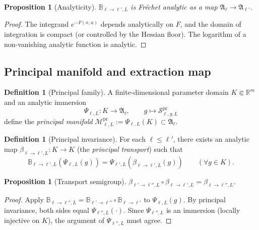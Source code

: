 \documentclass[12pt]{article}
\theoremstyle{plain}
\newtheorem{proposition}[theorem]{Proposition}
\theoremstyle{definition}
\newtheorem{definition}[theorem]{Definition}
\numberwithin{equation}{section}
\newcommand{\R}{\mathbb{R}}
\newcommand{\fA}{\mathfrak{A}}
\newcommand{\pr}{\mathrm{pr}}
\begin{document}
\begin{proposition}[Analyticity]
$\mathbb{B}_{\ell\to\ell',L}$ is Fr\'echet analytic as a map $\fA_\ell\to\fA_{\ell'}$.
\end{proposition}

\begin{proof}
The integrand $e^{-F(x,u)}$ depends analytically on $F$, and the domain of integration is compact (or controlled by the Hessian floor).  The logarithm of a non-vanishing analytic function is analytic.
\end{proof}

\subsection{Principal manifold and extraction map}

\begin{definition}[Principal family]
A finite-dimensional parameter domain $K\Subset\R^m$ and an analytic immersion
\begin{equation}
\Psi_{\ell,L}:K\to\fA_\ell,\qquad g\mapsto\mathcal{S}^{\pr}_{\ell,g,L}
\end{equation}
define the \emph{principal manifold} $\mathcal{M}^{\pr}_{\ell,L}:=\Psi_{\ell,L}(K)\subset\fA_\ell$.
\end{definition}

\begin{definition}[Principal invariance]
For each $\ell\leq\ell'$, there exists an analytic map $\beta_{\ell\to\ell',L}:K\to K$ (the \emph{principal transport}) such that
\begin{equation}
\mathbb{B}_{\ell\to\ell',L}(\Psi_{\ell,L}(g)) = \Psi_{\ell',L}(\beta_{\ell\to\ell',L}(g))\qquad(\forall g\in K).
\end{equation}
\end{definition}

\begin{proposition}[Transport semigroup]
$\beta_{\ell'\to\ell'',L}\circ\beta_{\ell\to\ell',L}=\beta_{\ell\to\ell'',L}$.
\end{proposition}

\begin{proof}
Apply $\mathbb{B}_{\ell\to\ell'',L}=\mathbb{B}_{\ell'\to\ell''}\circ\mathbb{B}_{\ell\to\ell'}$ to $\Psi_{\ell,L}(g)$.  By principal invariance, both sides equal $\Psi_{\ell'',L}(\cdot)$.  Since $\Psi_{\ell'',L}$ is an immersion (locally injective on $K$), the argument of $\Psi_{\ell'',L}$ must agree.
\end{proof}
\end{document}
